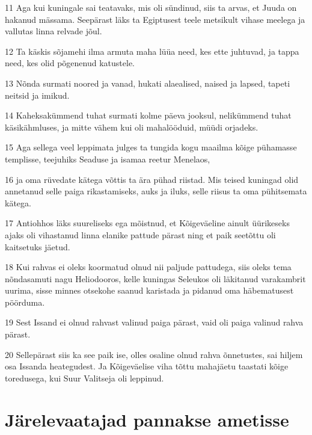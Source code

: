 \par 11 Aga kui kuningale sai teatavaks, mis oli sündinud, siis ta arvas, et Juuda on hakanud mässama. Seepärast läks ta Egiptusest teele metsikult vihase meelega ja vallutas linna relvade jõul.
\par 12 Ta käskis sõjamehi ilma armuta maha lüüa need, kes ette juhtuvad, ja tappa need, kes olid põgenenud katustele.
\par 13 Nõnda surmati noored ja vanad, hukati alaealised, naised ja lapsed, tapeti neitsid ja imikud.
\par 14 Kaheksakümmend tuhat surmati kolme päeva jooksul, nelikümmend tuhat käsikähmluses, ja mitte vähem kui oli mahalööduid, müüdi orjadeks.
\par 15 Aga sellega veel leppimata julges ta tungida kogu maailma kõige pühamasse templisse, teejuhiks Seaduse ja isamaa reetur Menelaos,
\par 16 ja oma rüvedate kätega võttis ta ära pühad riistad. Mis teised kuningad olid annetanud selle paiga rikastamiseks, auks ja iluks, selle riisus ta oma pühitsemata kätega.
\par 17 Antiohhos läks suureliseks ega mõistnud, et Kõigeväeline ainult üürikeseks ajaks oli vihastanud linna elanike pattude pärast ning et paik seetõttu oli kaitsetuks jäetud.
\par 18 Kui rahvas ei oleks koormatud olnud nii paljude pattudega, siis oleks tema nõndasamuti nagu Heliodooros, kelle kuningas Seleukos oli läkitanud varakambrit uurima, sisse minnes otsekohe saanud karistada ja pidanud oma häbematusest pöörduma.
\par 19 Sest Issand ei olnud rahvast valinud paiga pärast, vaid oli paiga valinud rahva pärast.
\par 20 Sellepärast siis ka see paik ise, olles osaline olnud rahva õnnetustes, sai hiljem osa Issanda heategudest. Ja Kõigeväelise viha tõttu mahajäetu taastati kõige toredusega, kui Suur Valitseja oli leppinud.


\section*{Järelevaatajad pannakse ametisse}

